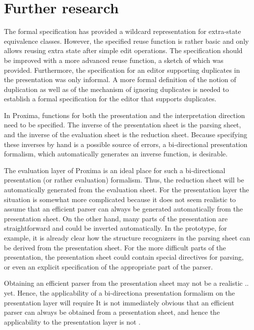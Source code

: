 \section{Further research}

The formal specification has provided a wildcard representation for extra-state equivalence classes. However, the specified reuse function is rather basic and only allows reusing extra state after simple edit operations. The specification should be improved with a more advanced reuse function, a sketch of which was provided. 
Furthermore, the specification for an editor supporting duplicates in the presentation was only informal. A more formal definition of the notion of duplication as well as of the mechanism of ignoring duplicates is needed to establish a formal specification for the editor that supports duplicates. 

In Proxima, functions for both the presentation and the interpretation direction need to be specified. The inverse of the presentation sheet is the parsing sheet, and the inverse of the evaluation sheet is the reduction sheet. Because specifying these inverses by hand is a possible source of errors, a bi-directional presentation formalism, which automatically generates an inverse function, is desirable. 

The evaluation layer of Proxima is an ideal place for such  a bi-directional presentation (or rather evaluation) formalism. Thus, the reduction sheet will be automatically generated from the evaluation sheet. For the presentation layer the situation is somewhat more complicated because it does not seem realistic to assume that an efficient parser can always be generated automatically from the presentation sheet. On the other hand, many parts of the presentation are straightforward and could be inverted automatically. In the prototype, for example, it is already clear how the structure recognizers in the parsing sheet can be derived from the presentation sheet. For the more difficult parts of the presentation, the presentation sheet could contain special directives for parsing, or even an explicit specification of the appropriate part of the parser.


\bc Obtaining an efficient parser from the presentation sheet may not be a realistic .. yet. Hence, the applicability of a bi-directiona presentation formalism on the presentation layer will require It is not immediately obvious that an efficient parser can always be obtained from a presentation sheet, and hence the applicability to the presentation layer is not . \ec

